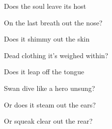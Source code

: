 \documentclass{article}
\begin{document}
\newline

Does the soul leave its host
\newline

On the last breath out the nose? 
\newline

Does it shimmy out the skin 
\newline

Dead clothing it's weighed within? 
\newline

Does it leap off the tongue 
\newline

Swan dive like a hero unsung?
\newline

Or does it steam out the ears?
\newline

Or squeak clear out the rear?
\newline
\end{document}
